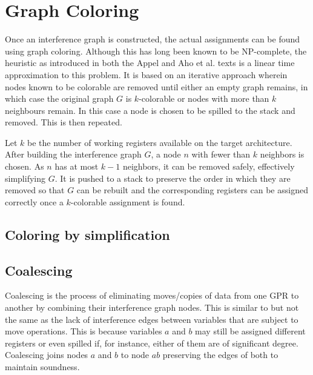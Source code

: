 \documentclass{article}
\begin{document}

\section{Graph Coloring}
Once an interference graph is constructed, the actual assignments can be found using graph coloring. Although this has long been known to be NP-complete, the heuristic as introduced in both the Appel and Aho et al. texts is a linear time approximation to this problem. It is based on an iterative approach wherein nodes known to be colorable are removed until either an empty graph remains, in which case the original graph \(G\) is \(k\)-colorable  or nodes with more than \(k\) neighbours remain. In this case a node is chosen to be spilled to the stack and removed. This is then repeated.

Let \(k\) be the number of working registers available on the target architecture. After building the interference graph \(G\), a node \(n\) with fewer than \(k\) neighbors is chosen. As \(n\) has at most \(k-1\) neighbors, it can be removed safely, effectively simplifying \(G\). It is pushed to a stack to preserve the order in which they are removed so that \(G\) can be rebuilt and the corresponding registers can be assigned correctly once a \(k\)-colorable assignment is found.



\subsection{Coloring by simplification}

\subsection{Coalescing}


Coalescing is the process of eliminating moves/copies of data from one GPR to another by combining their interference graph nodes.  This is similar to but  not the same as  the lack of interference edges between variables that are subject to move operations. This is because variables \(a\) and \(b\) may still be assigned different registers or even spilled if,  for instance, either of them are of significant degree. Coalescing joins nodes \(a\) and \(b\) to node \(ab\) preserving the edges of both to maintain soundness.
\end{document}
